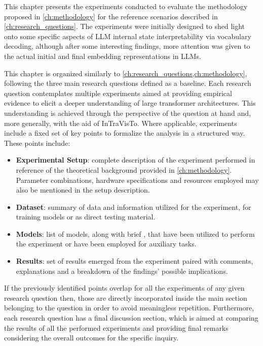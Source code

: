 This chapter presents the experiments conducted to evaluate the methodology proposed in \cref{ch:methodology} for the reference scenarios described in \cref{ch:research_questions}.
The experiments were initially designed to shed light onto some specific aspects of LLM internal state interpretability via vocabulary decoding, although after some interesting findings, more attention was given to the actual initial and final embedding representations in LLMs.

This chapter is organized similarly to \cref{ch:research_questions,ch:methodology}, following the three main research questions defined as a baseline.
Each research question contemplates multiple experiments aimed at providing empirical evidence to elicit a deeper understanding of large transformer architectures.
This understanding is achieved through the perspective of the question at hand and, more generally, with the aid of InTraVisTo.
Where applicable, experiments include a fixed set of key points to formalize the analysis in a structured way.
These points include:
\begin{itemize}
    \item \textbf{Experimental Setup}: complete description of the experiment performed in reference of the theoretical background provided in \cref{ch:methodology}.
Parameter combinations, hardware specifications and resources employed may also be mentioned in the setup description.
    \item \textbf{Dataset}: summary of data and information utilized for the experiment,  for training models or as direct testing material.
    \item \textbf{Models}: list of models, along with brief , that have been utilized to perform the experiment or have been employed for auxiliary tasks. 
    \item \textbf{Results}: set of results emerged from the experiment paired with comments, explanations and a breakdown of the findings' possible implications.
\end{itemize}
If the previously identified points overlap for all the  experiments of any given research question then, those are directly incorporated inside the main section belonging to the question in order to avoid meaningless repetition.
Furthermore, each research question has a final discussion section, which is aimed at comparing the results of all the performed experiments and providing final remarks considering the overall outcomes for the specific inquiry.

